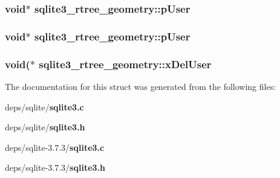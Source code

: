 \subsubsection{\setlength{\rightskip}{0pt plus 5cm}void$\ast$ \bf{sqlite3\_\-rtree\_\-geometry::p\-User}}\label{structsqlite3__rtree__geometry_83d3ce736019d751ac49e4fc91f4839c}


\subsubsection{\setlength{\rightskip}{0pt plus 5cm}void$\ast$ \bf{sqlite3\_\-rtree\_\-geometry::p\-User}}\label{structsqlite3__rtree__geometry_83d3ce736019d751ac49e4fc91f4839c}


\subsubsection{\setlength{\rightskip}{0pt plus 5cm}void($\ast$ \bf{sqlite3\_\-rtree\_\-geometry::x\-Del\-User}}\label{structsqlite3__rtree__geometry_cb5a4651e751c49aa76c9206141dca67}




The documentation for this struct was generated from the following files:\begin{CompactItemize}
\item 
deps/sqlite/\bf{sqlite3.c}\item 
deps/sqlite/\bf{sqlite3.h}\item 
deps/sqlite-3.7.3/\bf{sqlite3.c}\item 
deps/sqlite-3.7.3/\bf{sqlite3.h}\end{CompactItemize}
